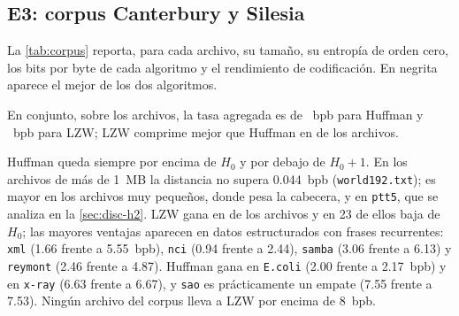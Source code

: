 \subsection{E3: corpus Canterbury y Silesia}
\label{sec:res-e3}
La \cref{tab:corpus} reporta, para cada archivo, su tamaño, su entropía de orden cero, los bits
por byte de cada algoritmo y el rendimiento de codificación. En negrita aparece el mejor de los
dos algoritmos.


En conjunto, sobre los \resCorpusFiles{} archivos, la tasa agregada es de
\resCorpusHuffBpb{}~bpb para Huffman y \resCorpusLzwBpb{}~bpb para LZW; LZW comprime mejor que Huffman en \resLzwWins{} de
los \resCorpusFiles{} archivos.

Huffman queda siempre por encima de $H_0$ y por debajo de $H_0 + 1$. En los archivos de más de
1~MB la distancia no supera 0.044~bpb (\texttt{world192.txt}); es mayor en los archivos muy
pequeños, donde pesa la cabecera, y en \texttt{ptt5}, que se analiza en la
\cref{sec:disc-h2}. LZW gana en \resLzwWins{} de los \resCorpusFiles{} archivos y en 23 de
ellos baja de $H_0$; las mayores ventajas aparecen en datos estructurados con frases
recurrentes: \texttt{xml} (1.66 frente a 5.55~bpb), \texttt{nci} (0.94 frente a 2.44),
\texttt{samba} (3.06 frente a 6.13) y \texttt{reymont} (2.46 frente a 4.87). Huffman gana en
\texttt{E.coli} (2.00 frente a 2.17~bpb) y en \texttt{x-ray} (6.63 frente a 6.67), y
\texttt{sao} es prácticamente un empate (7.55 frente a 7.53). Ningún archivo del corpus lleva a
LZW por encima de 8~bpb.

